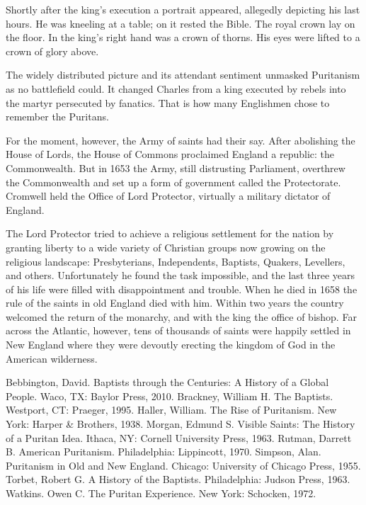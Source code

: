 Shortly after the king’s execution a portrait appeared, allegedly depicting his last hours. He was
kneeling at a table; on it rested the Bible. The royal crown lay on the floor. In the king’s right
hand was a crown of thorns. His eyes were lifted to a crown of glory above.

The widely distributed picture and its attendant sentiment unmasked Puritanism as no battlefield
could. It changed Charles from a king executed by rebels into the martyr persecuted by fanatics.
That is how many Englishmen chose to remember the Puritans.

For the moment, however, the Army of saints had their say. After abolishing the House of Lords, the
House of Commons proclaimed England a republic: the Commonwealth. But in 1653 the Army, still
distrusting Parliament, overthrew the Commonwealth and set up a form of government called the
Protectorate. Cromwell held the Office of Lord Protector, virtually a military dictator of England.

The Lord Protector tried to achieve a religious settlement for the nation by granting liberty to a
wide variety of Christian groups now growing on the religious landscape: Presbyterians,
Independents, Baptists, Quakers, Levellers, and others. Unfortunately he found the task impossible,
and the last three years of his life were filled with disappointment and trouble. When he died in
1658 the rule of the saints in old England died with him. Within two years the country welcomed the
return of the monarchy, and with the king the office of bishop. Far across the Atlantic, however,
tens of thousands of saints were happily settled in New England where they were devoutly erecting
the kingdom of God in the American wilderness.

\begin{readinglist}
\entry *Bebbington, David. Baptists through the Centuries: A History of a Global People. Waco, TX:
  Baylor Press, 2010.
\entry *Brackney, William H. The Baptists. Westport, CT: Praeger, 1995.
\entry Haller, William. The Rise of Puritanism. New York: Harper \& Brothers, 1938.
\entry Morgan, Edmund S. Visible Saints: The History of a Puritan Idea. Ithaca, NY: Cornell
  University Press, 1963.
\entry Rutman, Darrett B. American Puritanism. Philadelphia: Lippincott, 1970.
\entry Simpson, Alan. Puritanism in Old and New England. Chicago: University of Chicago Press, 1955.
\entry Torbet, Robert G. A History of the Baptists. Philadelphia: Judson Press, 1963.
\entry Watkins. Owen C. The Puritan Experience. New York: Schocken, 1972.
\end{readinglist}
